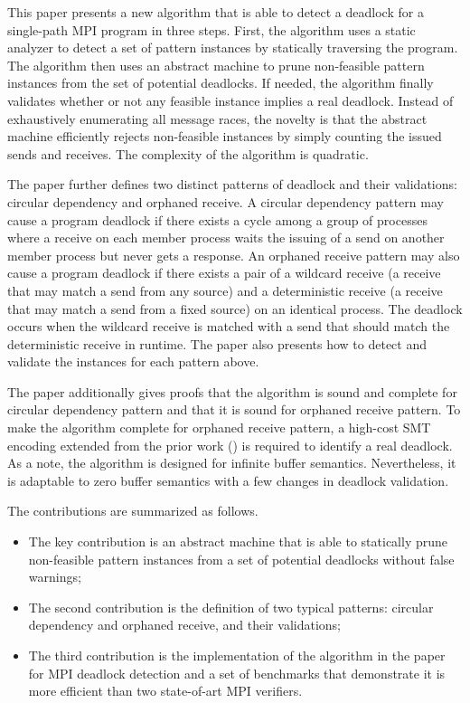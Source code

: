 This paper presents a new algorithm that is able to detect a deadlock for a single-path MPI program in three steps. First, the algorithm uses a static analyzer to detect a set of pattern instances by statically traversing the program. The algorithm then uses an abstract machine to prune non-feasible pattern instances from the set of potential deadlocks. If needed, the algorithm finally validates whether or not any feasible instance implies a real deadlock. Instead of exhaustively enumerating all message races, the novelty is that the abstract machine efficiently rejects non-feasible instances by simply counting the issued sends and receives. The complexity of the algorithm is quadratic. 

The paper further defines two distinct patterns of deadlock and their validations: circular dependency and orphaned receive. A circular dependency pattern may cause a program deadlock if there exists a cycle among a group of processes where a receive on each member process waits the issuing of a send on another member process but never gets a response. An orphaned receive pattern may also cause a program deadlock if there exists a pair of a wildcard receive (a receive that may match a send from any source) and a deterministic receive (a receive that may match a send from a fixed source) on an identical process. The deadlock occurs when the wildcard receive is matched with a send that should match the deterministic receive in runtime. The paper also presents how to detect and validate the instances for each pattern above.

The paper additionally gives proofs that the algorithm is sound and complete for circular dependency pattern and that it is sound for orphaned receive pattern. To make the algorithm complete for orphaned receive pattern, a high-cost SMT encoding extended from the prior work (\cite{DBLP:conf/kbse/HuangMM13,HuangNFM15}) is required to identify a real deadlock. As a note, the algorithm is designed for infinite buffer semantics. Nevertheless, it is adaptable to zero buffer semantics with a few changes in deadlock validation.

The contributions are summarized as follows.
\begin{itemize}
\item The key contribution is an abstract machine that is able to statically prune non-feasible pattern instances from a set of potential deadlocks without false warnings; 
\item The second contribution is the definition of two typical patterns: circular dependency and orphaned receive, and their validations;
\item The third contribution is the implementation of the algorithm in the paper for MPI deadlock detection and a set of benchmarks that demonstrate it is more efficient than two state-of-art MPI verifiers.
\end{itemize}

